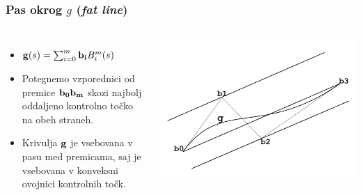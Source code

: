 \documentclass[unknownkeysallowed]{beamer}
\begin{document}
\begin{frame}
\frametitle{Pas okrog $g$ ({\em fat line})}
\begin{columns}[c]
	\begin{itemize}
		\item ${\bf g}(s) = \sum _{i=0}^m{\bf b_i}B_i^m(s)$
		\medskip
		\item Potegnemo vzporednici od premice ${\bf b_0b_m}$ skozi najbolj oddaljeno kontrolno točko na obeh straneh.
		\medskip
		\item Krivulja ${\bf g}$ je vsebovana v pasu med premicama, saj je vsebovana v konveksni ovojnici 
		kontrolnih točk.
	\end{itemize}
	\includegraphics[width=0.9\linewidth,frame]{fat_line}
\end{columns}
\end{frame}
\end{document}
